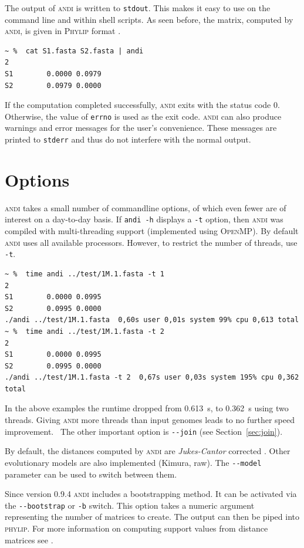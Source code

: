\documentclass[a4paper,
  10pt,
  english,
  DIV=12,
  BCOR=8mm]{scrbook}
\newcommand{\algo}[1]{\textsc{{#1}}}
\newcommand{\andi}{\algo{andi}\xspace}
\begin{document}
The output of \andi is written to \lstinline$stdout$. This makes it easy to use on the command line and within shell scripts. As seen before, the matrix, computed by \algo{andi}, is given in \algo{Phylip} format \cite{phylip}.

\begin{lstlisting}
~ %  cat S1.fasta S2.fasta | andi
2
S1        0.0000 0.0979
S2        0.0979 0.0000
\end{lstlisting}

If the computation completed successfully, \andi exits with the status code 0. Otherwise, the value of \lstinline$errno$ is used as the exit code. \andi can also produce warnings and error messages for the user's convenience. These messages are printed to \lstinline$stderr$ and thus do not interfere with the normal output.

\section{Options} \label{sec:options}

\andi takes a small number of commandline options, of which even fewer are of interest on a day-to-day basis. If \lstinline$andi -h$ displays a \lstinline$-t$ option, then \andi was compiled with multi-threading support (implemented using \algo{OpenMP}). By default \andi uses all available processors. However, to restrict the number of threads, use \lstinline$-t$.

\begin{lstlisting}
~ %  time andi ../test/1M.1.fasta -t 1
2
S1        0.0000 0.0995
S2        0.0995 0.0000
./andi ../test/1M.1.fasta  0,60s user 0,01s system 99% cpu 0,613 total
~ %  time andi ../test/1M.1.fasta -t 2
2
S1        0.0000 0.0995
S2        0.0995 0.0000
./andi ../test/1M.1.fasta -t 2  0,67s user 0,03s system 195% cpu 0,362 total
\end{lstlisting}

In the above examples the runtime dropped from \SI{0.613}{\second}, to \SI{0.362}{\second} using two threads. Giving \andi more threads than input genomes leads to no further speed improvement. \, The other important option is \lstinline$--join$ (see Section~\ref{sec:join}).

By default, the distances computed by \andi are \emph{Jukes-Cantor} corrected \cite{jukescantor}. Other evolutionary models are also implemented (Kimura, raw). The \lstinline$--model$ parameter can be used to switch between them.

Since version 0.9.4 \andi includes a bootstrapping method. It can be activated via the \lstinline$--bootstrap$ or \lstinline$-b$ switch. This option takes a numeric argument representing the number of matrices to create. The output can then be piped into \algo{phylip}. For more information on computing support values from distance matrices see \cite{afra}.
\end{document}
